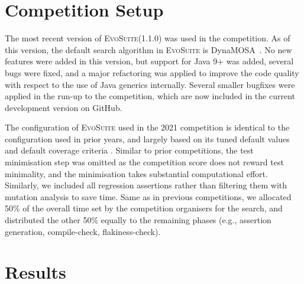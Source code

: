 \documentclass[sigconf,review,anonymous]{acmart}
\newcommand{\EVOSUITE}{\textsc{EvoSuite}\xspace}
\begin{document}





\section{Competition Setup}


The most recent version of \EVOSUITE (1.1.0) was used in the competition. As of
this version, the default search algorithm in \EVOSUITE is
DynaMOSA~\cite{dynamosa}. No new features were added in this version, but
support for Java 9+ was added, several bugs were fixed, and a major refactoring
was applied to improve the code quality with respect to the use of Java
generics internally. Several smaller bugfixes were applied in the run-up to the
competition, which are now included in the current development version on
GitHub.

The configuration of \EVOSUITE used in the 2021 competition is identical to the
configuration used in prior years, and largely based on its tuned default
values~\cite{arcuri2013parameter} and default coverage criteria
\cite{rojas2015combining}.
%
Similar to prior competitions, the test minimisation step was omitted as the competition score does not reward test minimality, and the minimisation takes substantial computational effort. Similarly, we included all regression assertions rather than filtering them with mutation analysis to save time. 
%
Same as in previous competitions, we allocated 50\% of
the overall time set by the competition organisers for the search, and
distributed the other 50\% equally to the remaining phases (e.g., assertion generation, compile-check, flakiness-check).



\section{Results}
\end{document}
